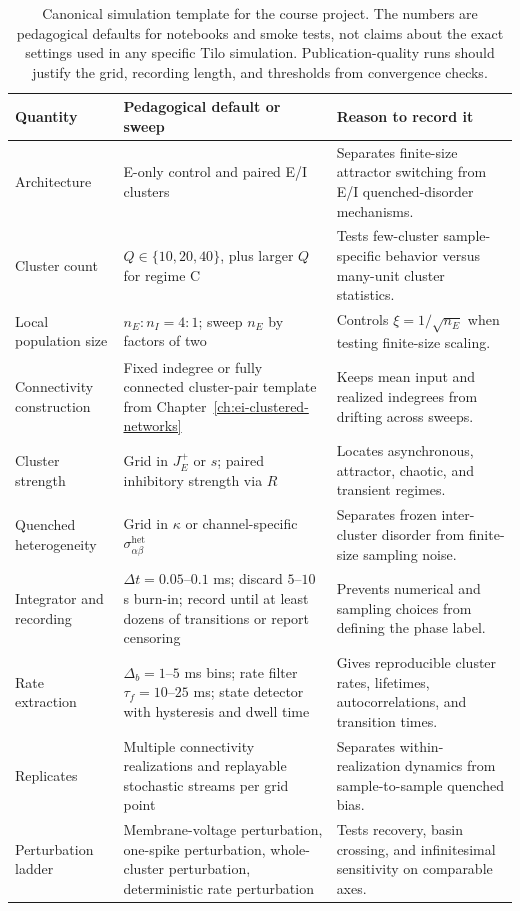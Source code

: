 \begin{table}[t]
\centering
\small
\begin{tabularx}{\textwidth}{@{}p{}p{}X@{}}
\toprule
\textbf{Quantity} & \textbf{Pedagogical default or sweep} & \textbf{Reason to record it} \\
\midrule
Architecture & E-only control and paired E/I clusters & Separates finite-size attractor switching from E/I quenched-disorder mechanisms. \\
Cluster count & \(Q\in\{10,20,40\}\), plus larger \(Q\) for regime C & Tests few-cluster sample-specific behavior versus many-unit cluster statistics. \\
Local population size & \(n_E:n_I=4:1\); sweep \(n_E\) by factors of two & Controls \(\xi=1/\sqrt{n_E}\) when testing finite-size scaling. \\
Connectivity construction & Fixed indegree or fully connected cluster-pair template from Chapter~\ref{ch:ei-clustered-networks} & Keeps mean input and realized indegrees from drifting across sweeps. \\
Cluster strength & Grid in \(J_E^+\) or \(s\); paired inhibitory strength via \(R\) & Locates asynchronous, attractor, chaotic, and transient regimes. \\
Quenched heterogeneity & Grid in \(\kappa\) or channel-specific \(\sigma_{\alpha\beta}^{\mathrm{het}}\) & Separates frozen inter-cluster disorder from finite-size sampling noise. \\
Integrator and recording & \(\Delta t=0.05\)--\(0.1\) ms; discard \(5\)--\(10\) s burn-in; record until at least dozens of transitions or report censoring & Prevents numerical and sampling choices from defining the phase label. \\
Rate extraction & \(\Delta_b=1\)--\(5\) ms bins; rate filter \(\tau_f=10\)--\(25\) ms; state detector with hysteresis and dwell time & Gives reproducible cluster rates, lifetimes, autocorrelations, and transition times. \\
Replicates & Multiple connectivity realizations and replayable stochastic streams per grid point & Separates within-realization dynamics from sample-to-sample quenched bias. \\
Perturbation ladder & Membrane-voltage perturbation, one-spike perturbation, whole-cluster perturbation, deterministic rate perturbation & Tests recovery, basin crossing, and infinitesimal sensitivity on comparable axes. \\
\bottomrule
\end{tabularx}
\caption{Canonical simulation template for the course project. The numbers are
pedagogical defaults for notebooks and smoke tests, not claims about the exact
settings used in any specific Tilo simulation. Publication-quality runs should
justify the grid, recording length, and thresholds from convergence checks.}
\label{tab:ch10-canonical-config}
\end{table}

